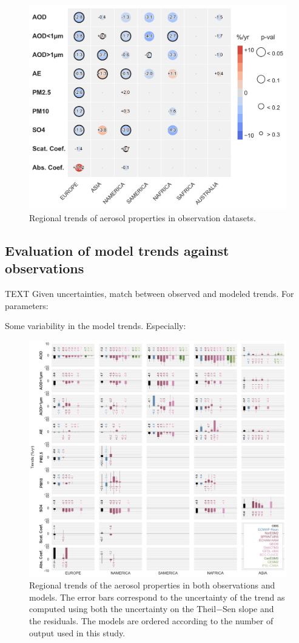 \documentclass[journal abbreviation, manuscript]{copernicus}
\begin{document}
\begin{figure}[t]
 \includegraphics[width=12cm]{../scripts/figs/heatmaps/OBS.png}
 \caption{Regional trends of aerosol properties in observation datasets.}
 \label{obs_trends}
\end{figure}


\subsection{Evaluation of model trends against observations}
TEXT
Given uncertainties, match between observed and modeled trends. For parameters:

Some variability in the model trends. Especially:


\begin{figure}[t]
 \includegraphics[width=16cm]{../scripts/figs/heatmaps/BARS.png}
 \caption{Regional trends of the aerosol properties in both observations and models. The error bars correspond to the uncertainty of the trend as computed using both the uncertainty on the Theil−Sen slope and the residuals. The models are ordered according to the number of output used in this study.}
 \label{bars}
\end{figure}
\end{document}
